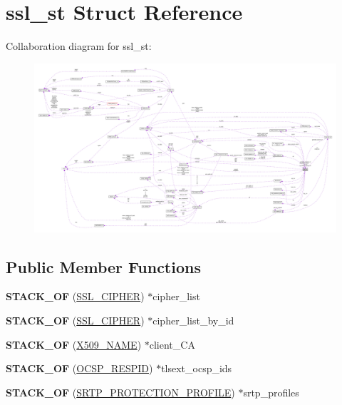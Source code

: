 \hypertarget{structssl__st}{}\section{ssl\+\_\+st Struct Reference}
\label{structssl__st}


Collaboration diagram for ssl\+\_\+st\+:
\nopagebreak
\begin{figure}[H]
\begin{center}
\leavevmode
\includegraphics[width=350pt]{structssl__st__coll__graph}
\end{center}
\end{figure}
\subsection*{Public Member Functions}
\begin{DoxyCompactItemize}
\item 
\mbox{\label{structssl__st_ab6c66fd31facb850ca3489e8b6662fc5}} 
{\bfseries S\+T\+A\+C\+K\+\_\+\+OF} (\hyperlink{structssl__cipher__st}{S\+S\+L\+\_\+\+C\+I\+P\+H\+ER}) $\ast$cipher\+\_\+list
\item 
\mbox{\label{structssl__st_a2bc578cfbd4fd422970e4a9b1a92a207}} 
{\bfseries S\+T\+A\+C\+K\+\_\+\+OF} (\hyperlink{structssl__cipher__st}{S\+S\+L\+\_\+\+C\+I\+P\+H\+ER}) $\ast$cipher\+\_\+list\+\_\+by\+\_\+id
\item 
\mbox{\label{structssl__st_a6951f8f6d0c8db4ff06352aaaa930a73}} 
{\bfseries S\+T\+A\+C\+K\+\_\+\+OF} (\hyperlink{structX509__name__st}{X509\+\_\+\+N\+A\+ME}) $\ast$client\+\_\+\+CA
\item 
\mbox{\label{structssl__st_af4fc0dee1ca3a84a8715babe6b80731e}} 
{\bfseries S\+T\+A\+C\+K\+\_\+\+OF} (\hyperlink{structocsp__responder__id__st}{O\+C\+S\+P\+\_\+\+R\+E\+S\+P\+ID}) $\ast$tlsext\+\_\+ocsp\+\_\+ids
\item 
\mbox{\label{structssl__st_a329c95fa618975c16e2b4c8cab8a83b2}} 
{\bfseries S\+T\+A\+C\+K\+\_\+\+OF} (\hyperlink{structsrtp__protection__profile__st}{S\+R\+T\+P\+\_\+\+P\+R\+O\+T\+E\+C\+T\+I\+O\+N\+\_\+\+P\+R\+O\+F\+I\+LE}) $\ast$srtp\+\_\+profiles
\end{DoxyCompactItemize}
